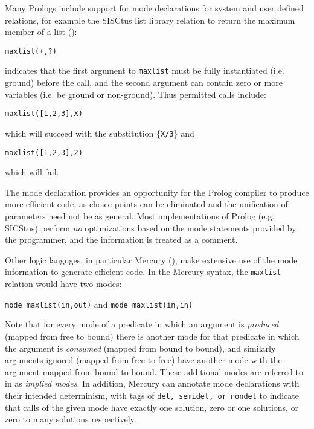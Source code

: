 Many Prologs include support for mode declarations for system and user defined relations,
for example the SISCtus list library relation to return the maximum member of
a list (\cite{BBP+94}):\\
\begin{center}\texttt{maxlist(+,?)}\end{center}
indicates that the first argument to \texttt{maxlist} must be fully
instantiated (i.e. ground) before the call,
and the second argument can contain zero or more variables
(i.e. be ground or non-ground).  Thus permitted calls include:\\
\begin{center}\texttt{maxlist([1,2,3],X)}\end{center}
which will succeed with the substitution \{\texttt{X/3}\} and\\
\begin{center}\texttt{maxlist([1,2,3],2)}\end{center}
which will fail.

The mode declaration provides an opportunity for the Prolog compiler to produce more efficient
code, as choice points can be eliminated and the unification of parameters need not be as
general.  Most implementations of Prolog (e.g. SICStus) perform \textit{no}
optimizations based on the mode statements provided by the programmer, and the information is
treated as a comment.

Other logic languges, in particular Mercury (\cite{SHC95}), make extensive use of the mode
information to generate efficient code.
In the Mercury syntax, the \texttt{maxlist} relation would have two modes:\\
\begin{center}\texttt{mode maxlist(in,out)} and \texttt{mode maxlist(in,in)}\end{center}
Note that for every mode of a predicate in which an argument is \textit{produced} (mapped
from free to bound) there is another mode for that predicate in which the argument is
\textit{consumed} (mapped from bound to bound), and similarly arguments ignored (mapped from
free to free) have another mode with the argument mapped from bound to bound.  These additional
modes are referred to in \cite{SHC95} as \textit{implied modes}.
In addition, Mercury can annotate mode declarations with their intended determinism, with tags of
\texttt{det, semidet, or nondet} to indicate that calls of the given mode have exactly one
solution, zero or one solutions, or zero to many solutions respectively.

